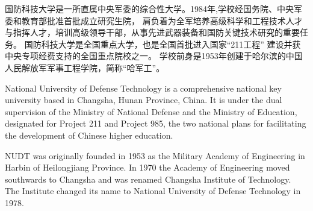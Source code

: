 \begin{cabstract}
国防科技大学是一所直属中央军委的综合性大学。1984年,学校经国务院、中央军委和教育部批准首批成立研究生院，%
肩负着为全军培养高级科学和工程技术人才与指挥人才，培训高级领导干部，从事先进武器装备和国防关键技术研究的重要任务。%
国防科技大学是全国重点大学，也是全国首批进入国家“211工程” 建设并获中央专项经费支持的全国重点院校之一。%
学校前身是1953年创建于哈尔滨的中国人民解放军军事工程学院，简称“哈军工”。
\end{cabstract}

\begin{eabstract}
National University of Defense Technology is a comprehensive national key university based in Changsha, %
Hunan Province, China. It is under the dual supervision of the Ministry of National Defense %
and the Ministry of Education, designated for Project 211 and Project 985, %
the two national plans for facilitating the development of Chinese higher education. %

NUDT was originally founded in 1953 as the Military Academy of Engineering in Harbin of Heilongjiang Province. %
In 1970 the Academy of Engineering moved southwards to Changsha and was renamed Changsha Institute of Technology.%
 The Institute changed its name to National University of Defense Technology in 1978.

\end{eabstract}

